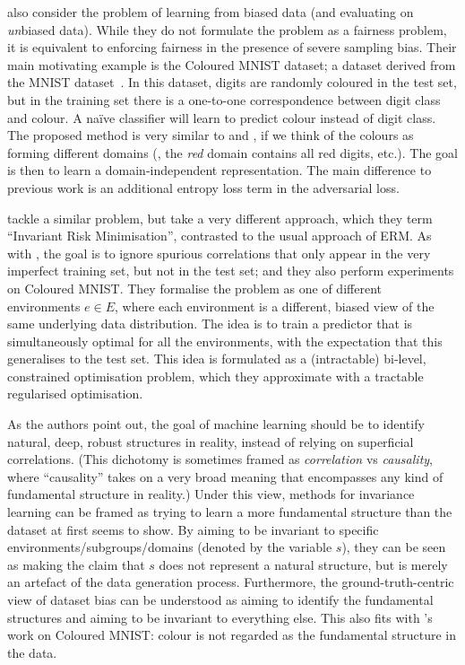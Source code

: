 \citet{kim2019learning} also consider the problem of learning from biased data (and evaluating on \emph{un}biased data).
While they do not formulate the problem as a fairness problem,
it is equivalent to enforcing fairness in the presence of severe sampling bias.
Their main motivating example is the Coloured MNIST dataset;
a dataset derived from the MNIST dataset~\citep{lecun1994mnist}.
In this dataset, digits are randomly coloured in the test set,
but in the training set there is a one-to-one correspondence between digit class and colour.
A na\"ive classifier will learn to predict colour instead of digit class.
The proposed method is very similar to \citet{ganin2016domain} and \citet{edwards2016censoring},
if we think of the colours as forming different domains
(\ie, the \emph{red} domain contains all red digits, etc.).
The goal is then to learn a domain-independent representation.
The main difference to previous work is an additional entropy loss term in the adversarial loss.

\citet{arjovsky2019invariant} tackle a similar problem, but take a very different approach,
which they term ``Invariant Risk Minimisation'', contrasted to the usual approach of \acf{ERM}.
As with \citet{kim2019learning},
the goal is to ignore spurious correlations that only appear in the very imperfect training set,
but not in the test set;
and they also perform experiments on Coloured MNIST.
They formalise the problem as one of different environments $e\in E$,
where each environment is a different, biased view of the same underlying data distribution.
The idea is to train a predictor that is simultaneously optimal for all the environments,
with the expectation that this generalises to the test set.
This idea is formulated as a (intractable) bi-level, constrained optimisation problem,
which they approximate with a tractable regularised optimisation.

As the authors point out,
the goal of machine learning should be to identify natural, deep, robust structures in reality,
instead of relying on superficial correlations.
(This dichotomy is sometimes framed as \emph{correlation} vs \emph{causality},
where ``causality'' takes on a very broad meaning that encompasses any kind of fundamental structure in reality.)
Under this view, methods for invariance learning can be framed as trying to learn a more fundamental structure
than the dataset at first seems to show.
By aiming to be invariant to specific environments/subgroups/domains (denoted by the variable \(s\)),
they can be seen as making the claim that \(s\) does not represent a natural structure,
but is merely an artefact of the data generation process.
Furthermore, the ground-truth-centric view of dataset bias can be understood as
aiming to identify the fundamental structures and aiming to be invariant to everything else.
This also fits with \citet{kim2019learning}'s work on Coloured MNIST:
colour is not regarded as the fundamental structure in the data.

